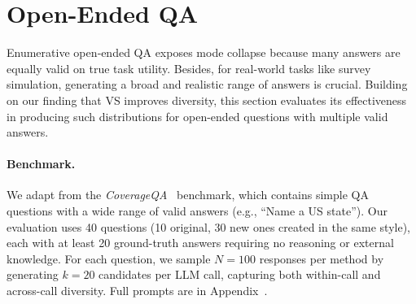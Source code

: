 \section{Open-Ended QA}\label{main:open_ended_qa}
Enumerative open‑ended QA exposes mode collapse because many answers are equally valid on true task utility. 
Besides, for real-world tasks like survey simulation, generating a broad and realistic range of answers is crucial. Building on our finding that VS improves diversity, this section evaluates its effectiveness in producing such distributions for open-ended questions with multiple valid answers.


\paragraph{Benchmark.} We adapt from the \textit{CoverageQA}~\citep{wong2024simplestratdiversifyinglanguagemodel} benchmark, which contains simple QA questions with a wide range of valid answers (e.g., ``Name a US state''). Our evaluation uses 40 questions (10 original, 30 new ones created in the same style), each with at least 20 ground-truth answers requiring no reasoning or external knowledge. For each question, we sample $N=100$ responses per method by generating $k=20$ candidates per LLM call, capturing both within-call and across-call diversity. Full prompts are in Appendix~.




